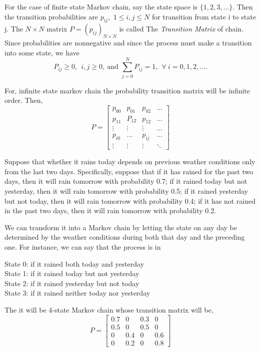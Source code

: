For the case of finite state Markov chain, say the state space is $ \{1,2,3,\ldots\} $. Then the transition probabilities are $ p_{ij}, $ 
$ 1\le i,j \le N $ for transition from state i to state j. The $ N\times N $ matrix  $ P = (p_{ij})_{N\times N} $ is called The
\textit{Transition Matrix} of chain. Since probabilities are nonnegative and since the process must make a transition into some state, we have
\[
    P_{ij}\ge 0,\ \ i,j\ge 0,\ \text{and } \sum_{j=0}^{N}P_{ij} = 1,\ \  \forall\ i=0,1,2,\ldots.
\]

For, infinite state markov chain the probability transition matrix will be infinite order. 
Then,
\[
    P = 
    \begin{bmatrix}
        p_{00} & p_{01} & p_{02} & \ldots \\
        p_{11} & P_{12} & p_{12} & \ldots \\
        \vdots & \vdots & \vdots & \ldots \\ 
        p_{i0} & \ldots & p_{ij} & \ldots \\
        \vdots & \vdots & \vdots & \ddots 
    \end{bmatrix}
\]

\begin{example}
    Suppose that whether it rains today depends on previous weather conditions only from the last two days. 
    Specifically, suppose that if it has rained for the past two days, 
    then it will rain tomorrow with probability 0.7; 
    if it rained today but not yesterday, then it will rain tomorrow with probability 0.5; 
    if it rained yesterday but not today, then it will rain tomorrow with probability 0.4; 
    if it has not rained in the past two days, then it will rain tomorrow with probability 0.2.
    
    We can transform it into a Markov chain by letting the state on any day be determined by the weather conditions during both that day and 
    the preceding one. For instance, we can say that the process is in

    \begin{center}
        State 0: if it rained both today and yesterday\\ 
        State 1: if it rained today but not yesterday\\ 
        State 2: if it rained yesterday but not today\\ 
        State 3: if it rained neither today nor yesterday 

    \end{center}

    The it will be 4-state Markov chain whose transition matrix will be,
    \[
        P=
        \begin{bmatrix} 
            0.7 & 0 & 0.3 & 0 \\ 
            0.5 & 0 & 0.5 & 0 \\ 
            0 & 0.4 & 0 & 0.6 \\ 
            0 & 0.2 & 0 & 0.8
        \end{bmatrix} 
    \]
\end{example}

